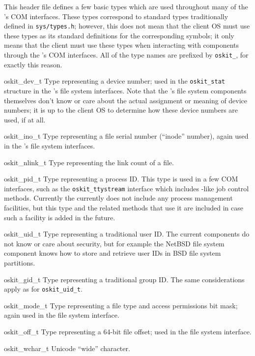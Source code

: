 \label{oskit-types-h}
\begin{apidesc}
	This header file defines a few basic types
	which are used throughout
	many of the \oskit's COM interfaces.
	These types correspond to standard \posix{} types
	traditionally defined in \texttt{sys/types.h};
	however, this does not mean that the client OS must use these types
	as its standard definitions for the corresponding \posix{} symbols;
	it only means that the client must use these types
	when interacting with \oskit{} components
	through the \oskit's COM interfaces.
	All of the type names are prefixed by \texttt{oskit_},
	for exactly this reason.

	\begin{icsymlist}
	\item[oskit_dev_t]
		Type representing a device number;
		used in the \texttt{oskit_stat} structure
		in the \oskit's file system interfaces.
		Note that the \oskit's file system components themselves
		don't know or care about
		the actual assignment or meaning of device numbers;
		it is up to the client OS to determine
		how these device numbers are used, if at all.
	\item[oskit_ino_t]
		Type representing a file serial number (``inode'' number),
		again used in the \oskit's file system interfaces.
	\item[oskit_nlink_t]
		Type representing the link count of a file.
	\item[oskit_pid_t]
		Type representing a process ID\@.
		This type is used in a few COM interfaces,
		such as the \texttt{oskit_ttystream} interface
		which includes \posix-like job control methods.
		Currently the \oskit{} currently does not include
		any process management facilities,
		but this type and the related methods that use it
		are included in case such a facility is added in the future.
	\item[oskit_uid_t]
		Type representing a traditional \posix{} user ID\@.
		The current \oskit{} components
		do not know or care about \posix{} security,
		but for example the NetBSD file system component
		knows how to store and retrieve user IDs
		in BSD file system partitions.
	\item[oskit_gid_t]
		Type representing a traditional \posix{} group ID\@.
		The same considerations apply as for \texttt{oskit_uid_t}.
	\item[oskit_mode_t]
		Type representing a file type and access permissions bit mask;
		again used in the file system interface.
	\item[oskit_off_t]
		Type representing a 64-bit file offset;
		used in the file system interface.
	\item[oskit_wchar_t]
		Unicode ``wide'' character.
	\end{icsymlist}
\end{apidesc}

